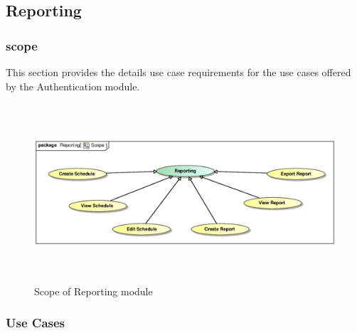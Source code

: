 \subsection{Reporting}

\subsubsection{scope}
\par{This section provides the details use case requirements for the use cases offered by the Authentication
module.}

\begin{figure}[h]
\includegraphics[height=250px, width=500px]{epsImages/Reporting/ReportScope.eps}
\caption{Scope of Reporting module}
\end{figure}


\subsubsection{Use Cases}

